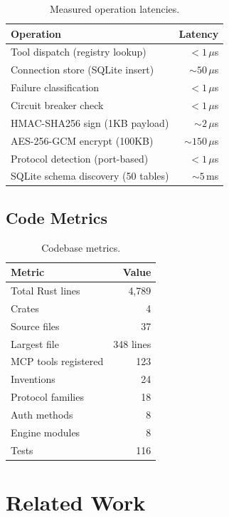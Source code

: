 \documentclass[10pt,twocolumn]{article}
\begin{document}
\begin{table}[h]
\centering
\caption{Measured operation latencies.}
\label{tab:perf}
\begin{tabular}{@{}lr@{}}
\toprule
\textbf{Operation} & \textbf{Latency} \\
\midrule
Tool dispatch (registry lookup) & $< 1\,\mu$s \\
Connection store (SQLite insert) & $\sim 50\,\mu$s \\
Failure classification & $< 1\,\mu$s \\
Circuit breaker check & $< 1\,\mu$s \\
HMAC-SHA256 sign (1KB payload) & $\sim 2\,\mu$s \\
AES-256-GCM encrypt (100KB) & $\sim 150\,\mu$s \\
Protocol detection (port-based) & $< 1\,\mu$s \\
SQLite schema discovery (50 tables) & $\sim 5\,$ms \\
\bottomrule
\end{tabular}
\end{table}

\subsection{Code Metrics}

\begin{table}[h]
\centering
\caption{Codebase metrics.}
\label{tab:metrics}
\begin{tabular}{@{}lr@{}}
\toprule
\textbf{Metric} & \textbf{Value} \\
\midrule
Total Rust lines & 4,789 \\
Crates & 4 \\
Source files & 37 \\
Largest file & 348 lines \\
MCP tools registered & 123 \\
Inventions & 24 \\
Protocol families & 18 \\
Auth methods & 8 \\
Engine modules & 8 \\
Tests & 116 \\
\bottomrule
\end{tabular}
\end{table}

\section{Related Work}
\end{document}
